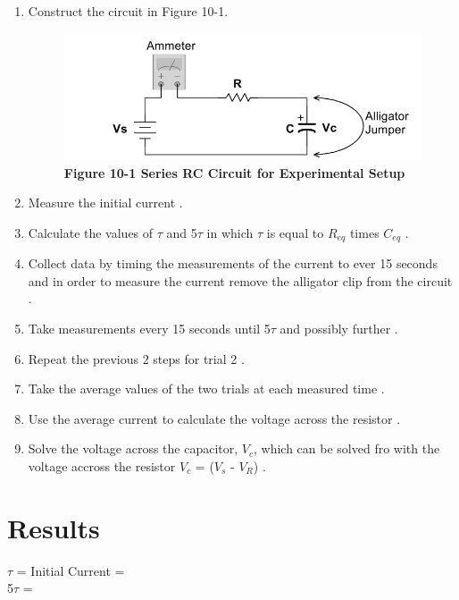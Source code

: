 \documentclass[a4paper]{article}
\begin{document}
\begin{enumerate}
    \item Construct the circuit in Figure 10-1\cite{UNCC-ECE-Dept:2023}.
    \begin{figure}[H]\label{fig10-1}
        \begin{center}
            \includegraphics[width = 7 cm]{fig10-1}\\
            \small\textbf{Figure 10-1 Series RC Circuit for Experimental Setup \cite{UNCC-ECE-Dept:2023}}
        \end{center}
    \end{figure} 
    \item Measure the initial current \cite{UNCC-ECE-Dept:2023}.
    \item Calculate the values of $\tau$ and 5$\tau$ in which $\tau$ is equal to $R_{eq}$ times $C_{eq}$ \cite{UNCC-ECE-Dept:2023}.
    \item Collect data by timing the measurements of the current to ever 15 seconds and in order to measure the current remove the alligator clip from the circuit \cite{UNCC-ECE-Dept:2023}.
    \item Take measurements every 15 seconds until 5$\tau$ and possibly further \cite{UNCC-ECE-Dept:2023}.
    \item Repeat the previous 2 steps for trial 2 \cite{UNCC-ECE-Dept:2023}.
    \item Take the average values of the two trials at each measured time \cite{UNCC-ECE-Dept:2023}.
    \item Use the average current to calculate the voltage across the resistor \cite{UNCC-ECE-Dept:2023}.
    \item Solve the voltage across the capacitor, $V_{c}$, which can be solved fro with the voltage accross the resistor $V_{c}$ = ($V_{s}$ - $V_{R}$) \cite{UNCC-ECE-Dept:2023}.  
\end{enumerate}


\section{Results}
$\tau$ =  Initial Current =  \\
5$\tau$ =  \\
\end{document}

